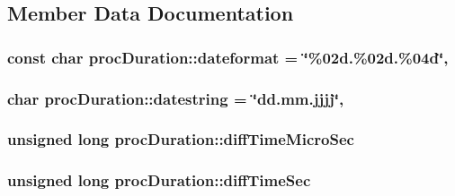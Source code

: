 \subsection{Member Data Documentation}
\hypertarget{classprocDuration_ae772881f1be51f9863b988e7fc7bfcf1}{
\subsubsection[{dateformat}]{\setlength{\rightskip}{0pt plus 5cm}const char proc\-Duration\-::dateformat = \char`\"{}\%02d.\%02d.\%04d\char`\"{}\hspace{0.3cm}{\ttfamily [static]}, {\ttfamily [protected]}}}\label{classprocDuration_ae772881f1be51f9863b988e7fc7bfcf1}
\hypertarget{classprocDuration_acb961644d3635fca50247316e4888ff7}{
\subsubsection[{datestring}]{\setlength{\rightskip}{0pt plus 5cm}char proc\-Duration\-::datestring = \char`\"{}dd.\-mm.\-jjjj\char`\"{}\hspace{0.3cm}{\ttfamily [static]}, {\ttfamily [protected]}}}\label{classprocDuration_acb961644d3635fca50247316e4888ff7}
\hypertarget{classprocDuration_a51854eb886bc5a872d2b930de46132e5}{
\subsubsection[{diff\-Time\-Micro\-Sec}]{\setlength{\rightskip}{0pt plus 5cm}unsigned long proc\-Duration\-::diff\-Time\-Micro\-Sec\hspace{0.3cm}{\ttfamily [protected]}}}\label{classprocDuration_a51854eb886bc5a872d2b930de46132e5}
\hypertarget{classprocDuration_ac9241af8f9ea5efa568e636683c22446}{
\subsubsection[{diff\-Time\-Sec}]{\setlength{\rightskip}{0pt plus 5cm}unsigned long proc\-Duration\-::diff\-Time\-Sec\hspace{0.3cm}{\ttfamily [protected]}}}\label{classprocDuration_ac9241af8f9ea5efa568e636683c22446}
